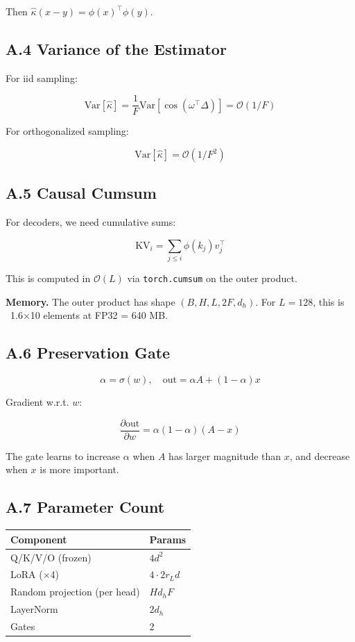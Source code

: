 Then $\hat{\kappa}(x - y) = \phi(x)^\top \phi(y)$.

\subsection{A.4 Variance of the Estimator}

For iid sampling:

\[
\text{Var}[\hat{\kappa}] = \frac{1}{F} \text{Var}[\cos(\omega^\top \Delta)] = \mathcal{O}(1/F)
\tag{A.8}
\]

For orthogonalized sampling:

\[
\text{Var}[\hat{\kappa}] = \mathcal{O}(1/F^2)
\tag{A.9}
\]

\subsection{A.5 Causal Cumsum}

For decoders, we need cumulative sums:

\[
\text{KV}_i = \sum_{j \leq i} \phi(k_j) v_j^\top
\tag{A.10}
\]

This is computed in $\mathcal{O}(L)$ via \texttt{torch.cumsum} on the outer product.

\textbf{Memory.} The outer product has shape $(B, H, L, 2F, d_h)$. For 
$L = 128$, this is ~1.6$\times$10  elements at FP32 = 640 MB.

\subsection{A.6 Preservation Gate}

\[
\alpha = \sigma(w), \quad \text{out} = \alpha A + (1 - \alpha) x
\tag{A.11}
\]

Gradient w.r.t. $w$:

\[
\frac{\partial \text{out}}{\partial w} = \alpha(1 - \alpha)(A - x)
\tag{A.12}
\]

The gate learns to increase $\alpha$ when $A$ has larger magnitude than $x$, and 
decrease when $x$ is more important.

\subsection{A.7 Parameter Count}

\begin{table}[H]
\centering
\small
\begin{tabular}{ll}
\toprule
\textbf{Component} & \textbf{Params} \\
\midrule
Q/K/V/O (frozen) & $4 d^2$ \\
LoRA ($\times$4) & $4 \cdot 2 r_L d$ \\
Random projection (per head) & $H d_h F$ \\
LayerNorm & $2 d_h$ \\
Gates & 2 \\
\bottomrule
\end{tabular}
\end{table}


